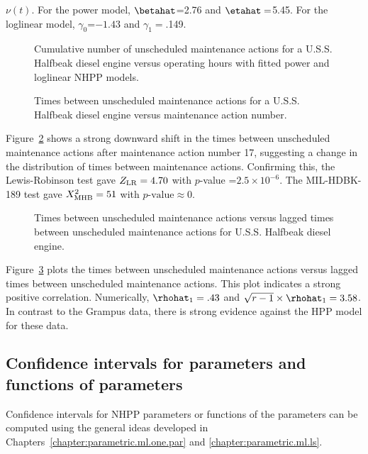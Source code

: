 \begin{example}
$\nu(t)$.  For the power model, $\betahat$=2.76 and $\etahat=$5.45.
For the loglinear model, $\gamma_{0}$=$-1.43$ and $\gamma_{1}=$.149.
\begin{figure}
\caption{Cumulative number of unscheduled 
maintenance actions for a U.S.S. Halfbeak diesel engine versus operating
hours with fitted power and loglinear NHPP models.}
\label{figure:halfbeak.mcf.nhpp.plot.ps}
\end{figure}
\begin{figure}
\caption{Times between unscheduled maintenance actions for a U.S.S. Halfbeak
diesel engine versus maintenance action number.}
\label{figure:halfbeak.repair.tsplot.ps}
\end{figure}
Figure~\ref{figure:halfbeak.repair.tsplot.ps} shows a strong downward
shift in the times between unscheduled maintenance actions after
maintenance action number 17, suggesting a change in the
distribution of times between maintenance actions. Confirming this,
the Lewis-Robinson test gave
$Z_{\rm LR}=4.70$ with $p$-value =$2.5\times 10^{-6}$.  The
MIL-HDBK-189 test gave $X^{2}_{\rm MHB}=51$ with $p\mbox{-value}
\approx 0$.
\begin{figure}
\caption{Times 
between unscheduled maintenance actions versus lagged times between
unscheduled maintenance actions for U.S.S. Halfbeak diesel engine.}
\label{figure:halfbeak.ar1.plot.ps}
\end{figure}
Figure~\ref{figure:halfbeak.ar1.plot.ps} plots the times between
unscheduled maintenance actions versus lagged times between
unscheduled maintenance actions.  This plot indicates a strong
positive correlation. Numerically, $\rhohat_{1}=.43$ and $\sqrt{r-1}
\times \rhohat_{1} = 3.58$.  In contrast to the Grampus data, there is
strong evidence against the HPP model for these data.
\end{example}

\subsection{Confidence intervals for parameters and functions of
parameters}
Confidence intervals for NHPP parameters or functions of the parameters
can be computed using the
general ideas developed in Chapters~\ref{chapter:parametric.ml.one.par}
and \ref{chapter:parametric.ml.ls}.

